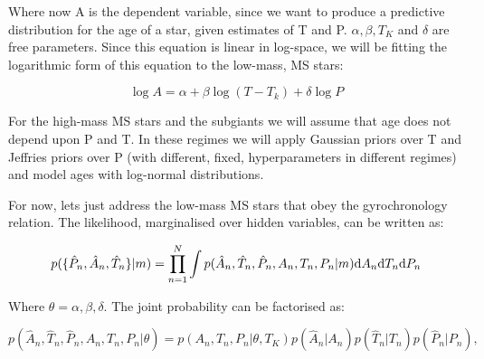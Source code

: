 \documentclass[12pt,preprint]{aastex}
\begin{document}
Where now A is the dependent variable, since we want to produce a predictive distribution for the age of a star, given estimates of T and P.
$\alpha, \beta, T_K$ and $\delta$ are free parameters.
Since this equation is linear in log-space, we will be fitting the logarithmic form of this equation to the low-mass, MS stars:

\begin{equation}
	\log{A} = \alpha + \beta \log{(T - T_k)} +  \delta \log{P}
\label{eq:log}
\end{equation}

For the high-mass MS stars and the subgiants we will assume that age does not depend upon P and T.
In these regimes we will apply Gaussian priors over T and Jeffries priors over P (with different, fixed, hyperparameters in different regimes) and model ages with log-normal distributions.

For now, lets just address the low-mass MS stars that obey the gyrochronology relation.
The likelihood, marginalised over hidden variables, can be written as:


\begin{equation}
  p(\{\hat{P}_n,\hat{A}_n,\hat{T}_n\}|m) =
  \prod_{n=1}^{N} \int p(\hat{A}_n,\hat{T}_n,\hat{P}_n,A_n,T_n,P_n|m)
  {\rm d}A_n {\rm d}T_n {\rm d}P_n
\label{eq:fullL}
\end{equation}

Where $\theta = \alpha, \beta, \delta$. The joint probability can be factorised as:


\begin{equation}
  p(\hat{A}_n,\hat{T}_n,\hat{P}_n,A_n,T_n,P_n|\theta) =
  p(A_n,T_n,P_n|\theta, T_K) p(\hat{A}_n|A_n)
  p(\hat{T}_n|T_n) p(\hat{P}_n|P_n),
\label{eq:jointprob}
\end{equation}
\end{document}
